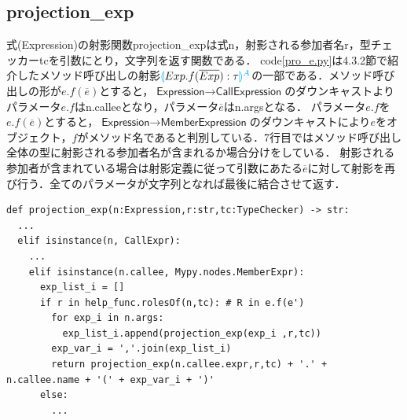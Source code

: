 \documentclass{thesis}
\newcommand{\projection}[2]{{\color{cyan}\llparenthesis}#1{\color{cyan}\rrparenthesis^#2}}
\begin{document}
\subsection{projection\_exp}
式(Expression)の射影関数projection\_expは式\textsf{n}，射影される参加者名\textsf{r}，型チェッカー\textsf{tc}を引数にとり，文字列を返す関数である．
code\ref{pro_e.py}は4.3.2節で紹介したメソッド呼び出しの射影$\projection{Exp.f(\overline{Exp}):\tau}{A}$の一部である．メソッド呼び出しの形が$e.f(\overline{e})$とすると，$\textsf{Expression} \rightarrow \textsf{CallExpression}$のダウンキャストよりパラメータ$e.f$はn.calleeとなり，パラメータ$\overline{e}$はn.argsとなる．
パラメータ$e.f$を$e.f(\overline{e})$とすると，$\textsf{Expression} \rightarrow \textsf{MemberExpression}$のダウンキャストにより$e$をオブジェクト，$f$がメソッド名であると判別している．7行目ではメソッド呼び出し全体の型に射影される参加者名が含まれるか場合分けをしている．
射影される参加者が含まれている場合は射影定義に従って引数にあたる$\overline{e}$に対して射影を再び行う．全てのパラメータが文字列となれば最後に結合させて返す．

\begin{lstlisting}[caption=pro\_e.py,label=pro_e.py]
def projection_exp(n:Expression,r:str,tc:TypeChecker) -> str:
  ... 
  elif isinstance(n, CallExpr):
    ... 
    elif isinstance(n.callee, Mypy.nodes.MemberExpr):
      exp_list_i = []
      if r in help_func.rolesOf(n,tc): # R in e.f(e')
        for exp_i in n.args:
          exp_list_i.append(projection_exp(exp_i ,r,tc))
        exp_var_i = ','.join(exp_list_i)
        return projection_exp(n.callee.expr,r,tc) + '.' + n.callee.name + '(' + exp_var_i + ')'
      else:
        ... 
\end{lstlisting}

\end{document}
